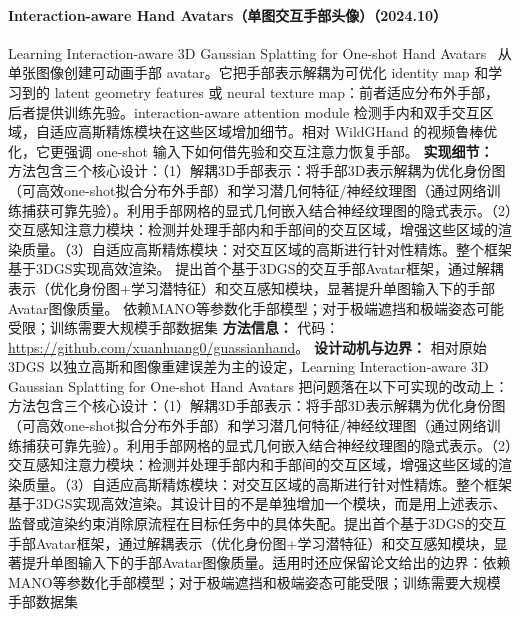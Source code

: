 \paragraph{Interaction-aware Hand Avatars（单图交互手部头像）（2024.10）}
Learning Interaction-aware 3D Gaussian Splatting for One-shot Hand Avatars~\cite{2410_08840} 从单张图像创建可动画手部 avatar。它把手部表示解耦为可优化 identity map 和学习到的 latent geometry features 或 neural texture map：前者适应分布外手部，后者提供训练先验。interaction-aware attention module 检测手内和双手交互区域，自适应高斯精炼模块在这些区域增加细节。相对 WildGHand 的视频鲁棒优化，它更强调 one-shot 输入下如何借先验和交互注意力恢复手部。
\textbf{实现细节：} 方法包含三个核心设计：（1）解耦3D手部表示：将手部3D表示解耦为优化身份图（可高效one-shot拟合分布外手部）和学习潜几何特征/神经纹理图（通过网络训练捕获可靠先验）。利用手部网格的显式几何嵌入结合神经纹理图的隐式表示。（2）交互感知注意力模块：检测并处理手部内和手部间的交互区域，增强这些区域的渲染质量。（3）自适应高斯精炼模块：对交互区域的高斯进行针对性精炼。整个框架基于3DGS实现高效渲染。 提出首个基于3DGS的交互手部Avatar框架，通过解耦表示（优化身份图+学习潜特征）和交互感知模块，显著提升单图输入下的手部Avatar图像质量。 依赖MANO等参数化手部模型；对于极端遮挡和极端姿态可能受限；训练需要大规模手部数据集
\textbf{方法信息：} 代码：\url{https://github.com/xuanhuang0/guassianhand}。
\textbf{设计动机与边界：} 相对原始 3DGS 以独立高斯和图像重建误差为主的设定，Learning Interaction-aware 3D Gaussian Splatting for One-shot Hand Avatars 把问题落在以下可实现的改动上：方法包含三个核心设计：（1）解耦3D手部表示：将手部3D表示解耦为优化身份图（可高效one-shot拟合分布外手部）和学习潜几何特征/神经纹理图（通过网络训练捕获可靠先验）。利用手部网格的显式几何嵌入结合神经纹理图的隐式表示。（2）交互感知注意力模块：检测并处理手部内和手部间的交互区域，增强这些区域的渲染质量。（3）自适应高斯精炼模块：对交互区域的高斯进行针对性精炼。整个框架基于3DGS实现高效渲染。其设计目的不是单独增加一个模块，而是用上述表示、监督或渲染约束消除原流程在目标任务中的具体失配。提出首个基于3DGS的交互手部Avatar框架，通过解耦表示（优化身份图+学习潜特征）和交互感知模块，显著提升单图输入下的手部Avatar图像质量。适用时还应保留论文给出的边界：依赖MANO等参数化手部模型；对于极端遮挡和极端姿态可能受限；训练需要大规模手部数据集
